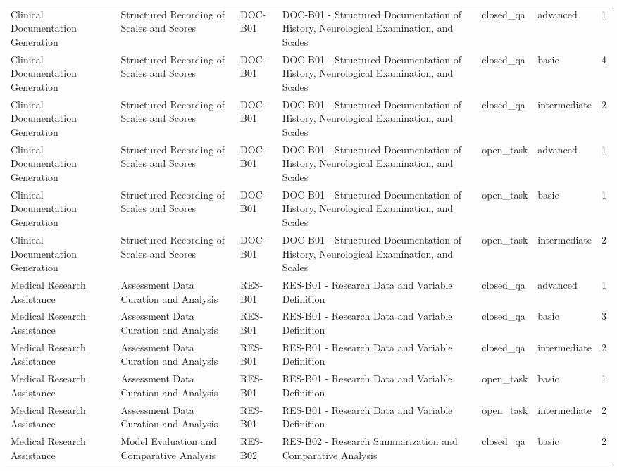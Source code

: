 \begin{tabular}{llllllr}
Clinical Documentation Generation & Structured Recording of Scales and Scores & DOC-B01 & DOC-B01 - Structured Documentation of History, Neurological Examination, and Scales & closed_qa & advanced & 1 \\
Clinical Documentation Generation & Structured Recording of Scales and Scores & DOC-B01 & DOC-B01 - Structured Documentation of History, Neurological Examination, and Scales & closed_qa & basic & 4 \\
Clinical Documentation Generation & Structured Recording of Scales and Scores & DOC-B01 & DOC-B01 - Structured Documentation of History, Neurological Examination, and Scales & closed_qa & intermediate & 2 \\
Clinical Documentation Generation & Structured Recording of Scales and Scores & DOC-B01 & DOC-B01 - Structured Documentation of History, Neurological Examination, and Scales & open_task & advanced & 1 \\
Clinical Documentation Generation & Structured Recording of Scales and Scores & DOC-B01 & DOC-B01 - Structured Documentation of History, Neurological Examination, and Scales & open_task & basic & 1 \\
Clinical Documentation Generation & Structured Recording of Scales and Scores & DOC-B01 & DOC-B01 - Structured Documentation of History, Neurological Examination, and Scales & open_task & intermediate & 2 \\
Medical Research Assistance & Assessment Data Curation and Analysis & RES-B01 & RES-B01 - Research Data and Variable Definition & closed_qa & advanced & 1 \\
Medical Research Assistance & Assessment Data Curation and Analysis & RES-B01 & RES-B01 - Research Data and Variable Definition & closed_qa & basic & 3 \\
Medical Research Assistance & Assessment Data Curation and Analysis & RES-B01 & RES-B01 - Research Data and Variable Definition & closed_qa & intermediate & 2 \\
Medical Research Assistance & Assessment Data Curation and Analysis & RES-B01 & RES-B01 - Research Data and Variable Definition & open_task & basic & 1 \\
Medical Research Assistance & Assessment Data Curation and Analysis & RES-B01 & RES-B01 - Research Data and Variable Definition & open_task & intermediate & 2 \\
Medical Research Assistance & Model Evaluation and Comparative Analysis & RES-B02 & RES-B02 - Research Summarization and Comparative Analysis & closed_qa & basic & 2 \\

\end{tabular}

